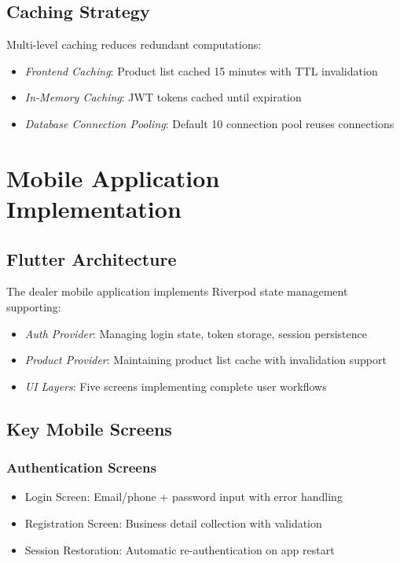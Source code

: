 \documentclass[conference]{IEEEtran}
\begin{document}
\subsection{Caching Strategy}

Multi-level caching reduces redundant computations:

\begin{itemize}
\item \textit{Frontend Caching}: Product list cached 15 minutes with TTL invalidation
\item \textit{In-Memory Caching}: JWT tokens cached until expiration
\item \textit{Database Connection Pooling}: Default 10 connection pool reuses connections
\end{itemize}

\section{Mobile Application Implementation}

\subsection{Flutter Architecture}

The dealer mobile application implements Riverpod state management supporting:

\begin{itemize}
\item \textit{Auth Provider}: Managing login state, token storage, session persistence
\item \textit{Product Provider}: Maintaining product list cache with invalidation support
\item \textit{UI Layers}: Five screens implementing complete user workflows
\end{itemize}

\subsection{Key Mobile Screens}

\subsubsection{Authentication Screens}
\begin{itemize}
\item Login Screen: Email/phone + password input with error handling
\item Registration Screen: Business detail collection with validation
\item Session Restoration: Automatic re-authentication on app restart
\end{itemize}
\end{document}
